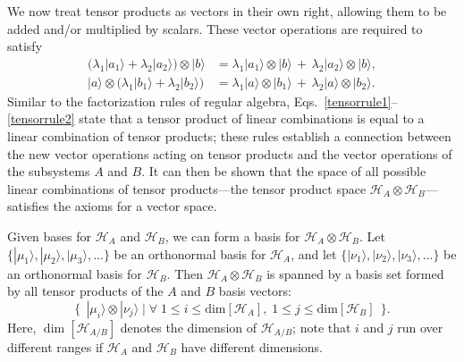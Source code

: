\documentclass[pra,12pt]{revtex4}
\begin{document}
We now treat tensor products as vectors in their own right, allowing
them to be added and/or multiplied by scalars.  These vector
operations are required to satisfy
\begin{align}
  \Big(\lambda_1 |a_1\rangle
  + \lambda_2 |a_2\rangle\Big) \otimes |b\rangle &=
  \lambda_1 |a_1\rangle \otimes |b\rangle \,+\,
  \lambda_2 |a_2\rangle \otimes |b\rangle, \label{tensorrule1} \\
  |a\rangle \otimes \Big(\lambda_1 |b_1\rangle
  + \lambda_2 |b_2\rangle\Big) &=
  \lambda_1 |a\rangle \otimes |b_1\rangle \,+\,
  \lambda_2 |a\rangle \otimes |b_2\rangle.
  \label{tensorrule2} 
\end{align}
Similar to the factorization rules of regular algebra,
Eqs.~\eqref{tensorrule1}--\eqref{tensorrule2} state that a tensor
product of linear combinations is equal to a linear combination of
tensor products; these rules establish a connection between the new
vector operations acting on tensor products and the vector operations
of the subsystems $A$ and $B$.  It can then be shown that the space of
all possible linear combinations of tensor products---the tensor
product space $\mathscr{H}_A \otimes \mathscr{H}_B$---satisfies the
axioms for a vector space.

Given bases for $\mathscr{H}_A$ and $\mathscr{H}_B$, we can form a
basis for $\mathscr{H}_A\otimes \mathscr{H}_B$.  Let $\{|\mu_1\rangle,
|\mu_2\rangle, |\mu_3\rangle, \dots\}$ be an orthonormal basis for
$\mathscr{H}_A$, and let $\{|\nu_1\rangle, |\nu_2\rangle,
|\nu_3\rangle, \dots\}$ be an orthonormal basis for $\mathscr{H}_B$.
Then $\mathscr{H}_A \otimes \mathscr{H}_B$ is spanned by a basis set
formed by all tensor products of the $A$ and $B$ basis vectors:
\begin{equation}
  \Big\{\;\,|\mu_i\rangle\otimes|\nu_j\rangle \;\Big|\;
  \forall \; 1 \le i \le \mathrm{dim}[\mathscr{H}_A],
  \; 1 \le j\le \mathrm{dim}[\mathscr{H}_B] \;\,\Big\}.
  \label{tensorbasis}
\end{equation}
Here, $\dim[\mathscr{H}_{A/B}]$ denotes the dimension of
$\mathscr{H}_{A/B}$; note that $i$ and $j$ run over different ranges
if $\mathscr{H}_{A}$ and $\mathscr{H}_{B}$ have different dimensions.
\end{document}
